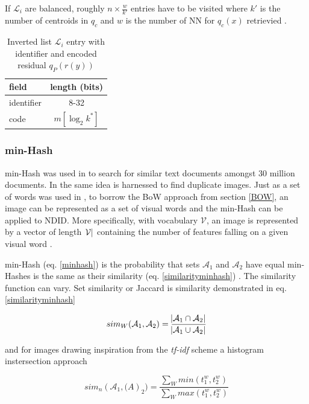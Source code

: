 \documentclass[english,12pt,a4paper,pdftex,elec,utf8]{aaltothesis}
\begin{document}
If $\mathcal{L}_i$ are balanced, roughly $n \times \frac{w}{k'}$ entries have to be visited where $k'$ is the number of centroids in $q_c$ and $w$ is the number of NN for $q_c(x)$ retrievied \cite{Jegou2008}.

\def\arraystretch{1.5}
\begin{table}[htb]
\caption{Inverted list $\mathcal{L}_i$ entry with identifier and encoded residual $q_P(r(y))$ \cite{Jegou2008}}
\label{ivfadcentry}
\begin{center}
\begin{tabular}{lc}
  field & length (bits)\\
  \hline
  identifier&8-32\\
  code & $m[\log_2k^*]$\\
\end{tabular}
\end{center}\end{table}

\subsubsection{min-Hash}
min-Hash was used in \cite{Broder1997} to search for similar text documents amongst 30 million documents. In \cite{Chum2008} the same idea is harnessed to find duplicate images. Just as a set of words was used in \cite{Broder1997}, to borrow the BoW approach from section \ref{BOW}, an image can be represented as a set of visual words and the min-Hash can be applied to NDID. More specifically, with vocabulary $\mathcal{V}$, an image is represented by a vector of length $\abs{\mathcal{V}}$ containing the number of features falling on a given visual word \cite{Chum2008}.

min-Hash (eq. \ref{minhash}) is the probability that sets $\mathcal{A}_1$ and $\mathcal{A}_2$ have equal min-Hashes is the same as their similarity (eq. \ref{similarityminhash}) \cite{Chum2008}. The similarity function can vary. Set similarity or Jaccard is similarity demonstrated in eq. \ref{similarityminhash}

\begin{equation}\label{similarityminhash}
sim_W(\mathcal{A}_1,\mathcal{A}_2) = \frac{\abs{\mathcal{A}_1 \cap \mathcal{A}_2}}{\abs{\mathcal{A}_1 \cup \mathcal{A}_2}}
\end{equation}

 and for images drawing inspiration from the \emph{tf-idf} scheme a histogram instersection approach

\begin{equation}\label{similarityminhashimages}
sim_n(\mathcal{A}_1, \mathcal(A)_2)=\frac{\sum_W min(t^w_1,t^w_2)}{\sum_W max(t^w_1,t^w_2)}
\end{equation}
\end{document}
